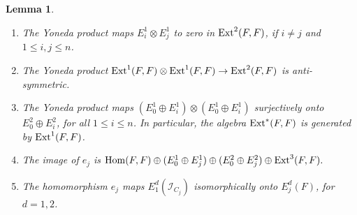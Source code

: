 \documentclass[12pt]{amsart}
\numberwithin{equation}{subsection}
\theoremstyle{plain}
\newtheorem{lem}[thm]{Lemma}
\theoremstyle{definition}
\newcommand{\Ext}{{\rm Ext}}
\newcommand{\Hom}{{\rm Hom}}
\newcommand{\Ideal}[1]{{\mathcal I}_{#1}}
\begin{document}
\begin{lem}
\label{lemma-Yoneda-algebra-is-generated-in-degree-1}
\begin{enumerate}
\item
\label{lemma-item-vanishing-of-Yoneda-product}
The Yoneda product maps $E^1_i\otimes E^1_j$ to zero in $\Ext^2(F,F)$, if $i\neq j$ and $1\leq i,j\leq n$.
\item
\label{lemma-item-yoneda-product-is-anti-symmetric}
The Yoneda product $\Ext^1(F,F)\otimes \Ext^1(F,F)\rightarrow \Ext^2(F,F)$ is anti-symmetric.
\item
\label{lemma-item-Yoneda-algebra-generated-by-Ext-1}
The Yoneda product maps  $(E^1_0\oplus E^1_i)\otimes (E^1_0\oplus E^1_i)$ surjectively onto $E^2_0\oplus E^2_i$, for all $1\leq i\leq n$. In particular, the algebra $\Ext^*(F,F)$ is generated by $\Ext^1(F,F)$.
\item
\label{lemma-item-image-of-e-j}
The image of $e_j$ is $\Hom(F,F)\oplus (E^1_0\oplus E^1_j) \oplus (E^2_0\oplus E^2_j) \oplus \Ext^3(F,F).$
\item
\label{lemma-item-e-j-maps-E^2-j-to-same}
The  homomorphism $e_j$ maps  $E^d_1(\Ideal{C_j})$ isomorphically onto $E^d_j(F)$, for $d=1,2$.
\end{enumerate}
\end{lem}
\end{document}
